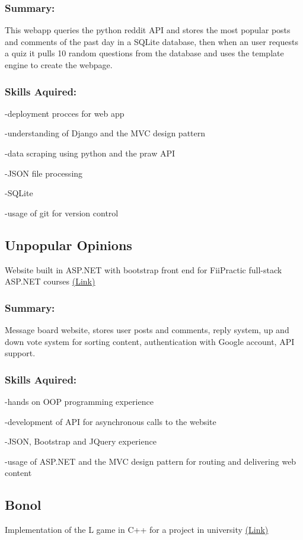 \documentclass[a4paper,hidelinks,8pt]{article}
\begin{document}
\subsubsection{Summary:}
This webapp queries the python reddit API and stores the most popular posts and comments of the past day
in a SQLite database, then when an user requests a quiz it pulls 10 random questions from the database and uses the template engine to create the webpage.
\subsubsection{Skills Aquired:}

-deployment procces for web app

-understanding of Django and the MVC design pattern

-data scraping using python and the praw API

-JSON file processing

-SQLite

-usage of git for version control

\subsection{Unpopular Opinions}
Website built in ASP.NET with bootstrap front end for FiiPractic full-stack ASP.NET courses \href{https://github.com/IureaMarius/UnpopularOpinions}{(Link)}
\subsubsection{Summary:}
Message board website, stores user posts and comments, reply system, up and down vote system for sorting content, authentication with Google account, API support.
\subsubsection{Skills Aquired:}
-hands on OOP programming experience

-development of API for asynchronous calls to the website

-JSON, Bootstrap and JQuery experience

-usage of ASP.NET and the MVC design pattern for routing and delivering web content

\subsection{Bonol}
Implementation of the L game in C++ for a project in university \href{https://github.com/IureaMarius/ProiectIP}{(Link)}
\end{document}

